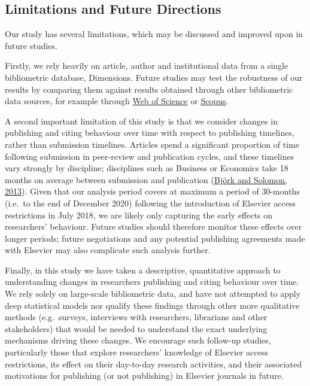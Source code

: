 \documentclass[
]{article}
\begin{document}
\hypertarget{limitations-and-future-directions}{%
\subsection{Limitations and Future Directions}\label{limitations-and-future-directions}}

Our study has several limitations, which may be discussed and improved upon in future studies.

Firstly, we rely heavily on article, author and institutional data from a single bibliometric database, Dimensions. Future studies may test the robustness of our results by comparing them against results obtained through other bibliometric data sources, for example through \href{https://www.webofknowledge.com/}{Web of Science} or \href{https://www.scopus.com}{Scopus}.

A second important limitation of this study is that we consider changes in publishing and citing behaviour over time with respect to publishing timelines, rather than submission timelines. Articles spend a significant proportion of time following submission in peer-review and publication cycles, and these timelines vary strongly by discipline; disciplines such as Business or Economics take 18 months on average between submission and publication (\href{https://doi.org/10.1016/j.joi.2013.09.001}{Björk and Solomon, 2013}). Given that our analysis period covers at maximum a period of 30-months (i.e.~to the end of December 2020) following the introduction of Elsevier access restrictions in July 2018, we are likely only capturing the early effects on researchers' behaviour. Future studies should therefore monitor these effects over longer periods; future negotiations and any potential publishing agreements made with Elsevier may also complicate such analysis further.

Finally, in this study we have taken a descriptive, quantitative approach to understanding changes in researchers publishing and citing behaviour over time. We rely solely on large-scale bibliometric data, and have not attempted to apply deep statistical models nor qualify these findings through other more qualitative methods (e.g.~surveys, interviews with researchers, librarians and other stakeholders) that would be needed to understand the exact underlying mechanisms driving these changes. We encourage such follow-up studies, particularly those that explore researchers' knowledge of Elsevier access restrictions, its effect on their day-to-day research activities, and their associated motivations for publishing (or not publishing) in Elsevier journals in future.
\end{document}
